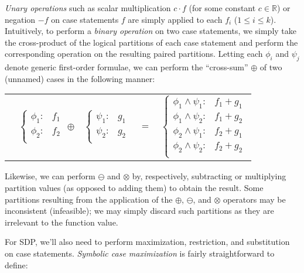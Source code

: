 \emph{Unary operations} such as scalar multiplication $c\cdot f$ (for
some constant $c \in \mathbb{R}$) or negation $-f$ on case statements
$f$ are simply applied to each
$f_i$ ($1 \leq i \leq k$). Intuitively, to perform a \emph{binary
  operation} on two case statements, we simply take the cross-product
of the logical partitions of each case statement and perform the
corresponding operation on the resulting paired partitions.  Letting
each $\phi_i$ and $\psi_j$ denote generic first-order formulae, we can
perform the ``cross-sum'' $\oplus$ of two (unnamed) cases in the
following manner:

{\footnotesize 
\begin{center}
\begin{tabular}{r c c c l}
&
\hspace{-6mm} 
  $\begin{cases}
    \phi_1: & f_1 \\ 
    \phi_2: & f_2 \\ 
  \end{cases}$
$\oplus$
&
\hspace{-4mm}
  $\begin{cases}
    \psi_1: & g_1 \\ 
    \psi_2: & g_2 \\ 
  \end{cases}$
&
\hspace{-2mm} 
$ = $
&
\hspace{-2mm}
  $\begin{cases}
  \phi_1 \wedge \psi_1: & f_1 + g_1 \\ 
  \phi_1 \wedge \psi_2: & f_1 + g_2 \\ 
  \phi_2 \wedge \psi_1: & f_2 + g_1 \\ 
  \phi_2 \wedge \psi_2: & f_2 + g_2 \\ 
  \end{cases}$
\end{tabular}
\end{center}
}
\normalsize

Likewise, we can perform $\ominus$ and $\otimes$ by,
respectively, subtracting or multiplying partition values (as opposed
to adding them) to obtain the result.  Some partitions resulting from
the application of the $\oplus$, $\ominus$, and $\otimes$ operators
may be inconsistent (infeasible); we may simply discard such 
partitions as they are irrelevant to the function value.

For SDP, we'll also need to perform maximization, restriction,
and substitution on case statements.  
\emph{Symbolic case maximization} is fairly straightforward
to define:
\vspace{-4mm}

